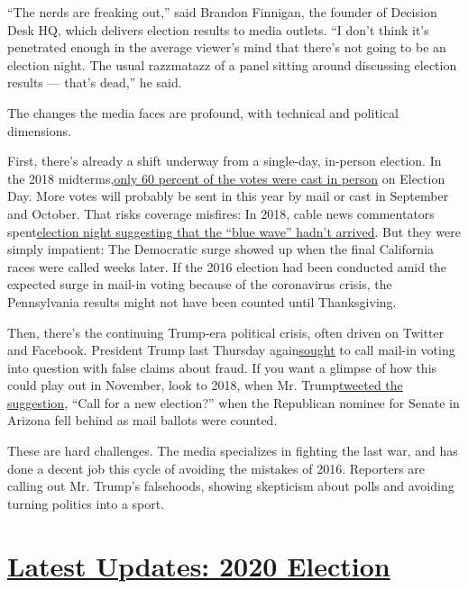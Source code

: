``The nerds are freaking out,'' said Brandon Finnigan, the founder of
Decision Desk HQ, which delivers election results to media outlets. ``I
don't think it's penetrated enough in the average viewer's mind that
there's not going to be an election night. The usual razzmatazz of a
panel sitting around discussing election results --- that's dead,'' he
said.

The changes the media faces are profound, with technical and political
dimensions.

First, there's already a shift underway from a single-day, in-person
election. In the 2018
midterms,\href{https://www.census.gov/library/stories/2019/04/behind-2018-united-states-midterm-election-turnout.html}{only
60 percent of the votes were cast in person} on Election Day. More votes
will probably be sent in this year by mail or cast in September and
October. That risks coverage misfires: In 2018, cable news commentators
spent\href{https://www.youtube.com/watch?v=T6FQmy-1Cfc}{election night
suggesting that the ``blue wave'' hadn't arrived}. But they were simply
impatient: The Democratic surge showed up when the final California
races were called weeks later. If the 2016 election had been conducted
amid the expected surge in mail-in voting because of the coronavirus
crisis, the Pennsylvania results might not have been counted until
Thanksgiving.

Then, there's the continuing Trump-era political crisis, often driven on
Twitter and Facebook. President Trump last Thursday
again\href{https://www.nytimes3xbfgragh.onion/2020/07/30/us/elections/biden-vs-trump.html}{sought}
to call mail-in voting into question with false claims about fraud. If
you want a glimpse of how this could play out in November, look to 2018,
when Mr.
Trump\href{https://twitter.com/realDonaldTrump/status/1060993836984324096}{tweeted
the suggestion}, ``Call for a new election?'' when the Republican
nominee for Senate in Arizona fell behind as mail ballots were counted.

These are hard challenges. The media specializes in fighting the last
war, and has done a decent job this cycle of avoiding the mistakes of
2016. Reporters are calling out Mr. Trump's falsehoods, showing
skepticism about polls and avoiding turning politics into a sport.

\hypertarget{latest-updates-2020-election}{%
\section{\texorpdfstring{\href{https://www.nytimes3xbfgragh.onion/2020/08/03/us/elections/biden-vs-trump.html?action=click\&pgtype=Article\&state=default\&region=MAIN_CONTENT_1\&context=storylines_live_updates}{Latest
Updates: 2020
Election}}{Latest Updates: 2020 Election}}\label{latest-updates-2020-election}}

